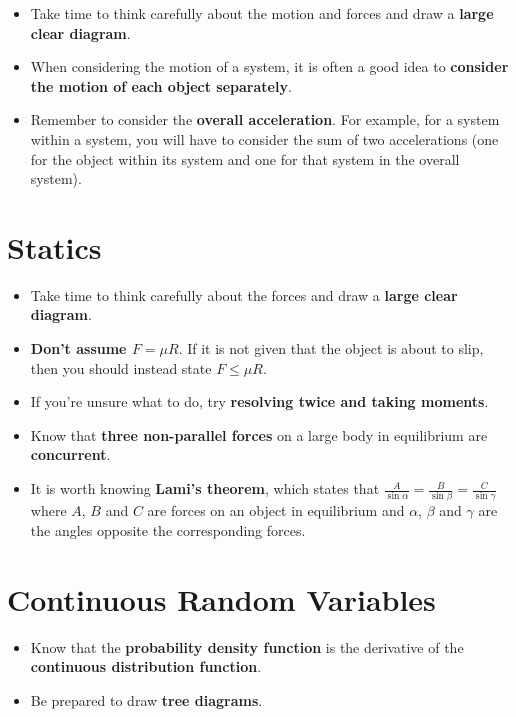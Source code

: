 \documentclass[9pt]{extarticle}
\begin{document}
	\begin{itemize}
		\item Take time to think carefully about the motion and forces and draw a \textbf{large clear diagram}.
		\item When considering the motion of a system, it is often a good idea to \textbf{consider the motion of each object separately}.
		\item Remember to consider the \textbf{overall acceleration}. For example, for a system within a system, you will have to consider the sum of two accelerations (one for the object within its system and one for that system in the overall system).
	\end{itemize}
	
	\section{Statics}
	
	\begin{itemize}
		\item Take time to think carefully about the forces and draw a \textbf{large clear diagram}.
		\item \textbf{Don't assume $F = \mu R$}. If it is not given that the object is about to slip, then you should instead state $F \leq \mu R$.
		\item If you're unsure what to do, try \textbf{resolving twice and taking moments}.
		\item Know that \textbf{three non-parallel forces} on a large body in equilibrium are \textbf{concurrent}.
		\item It is worth knowing \textbf{Lami's theorem}, which states that $\frac{A}{\sin\alpha} = \frac{B}{\sin\beta} = \frac{C}{\sin\gamma}$ where $A$, $B$ and $C$ are forces on an object in equilibrium and $\alpha$, $\beta$ and $\gamma$ are the angles opposite the corresponding forces.
	\end{itemize}
	
	\section{Continuous Random Variables}
	
	\begin{itemize}
		\item Know that the \textbf{probability density function} is the derivative of the \textbf{continuous distribution function}.
		\item Be prepared to draw \textbf{tree diagrams}.
	\end{itemize}
	
\end{document}
